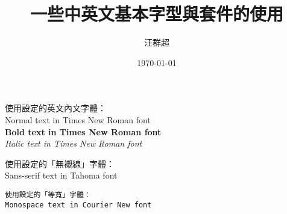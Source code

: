\documentclass[12pt, a4paper]{article}
\title{{\MB 一些中英文基本字型與套件的使用}}	%
\author{{\SM 汪群超}}						%
\date{{\C \today} } 					%
\begin{document}
\maketitle
\fontsize{12}{22pt}\selectfont %

使用設定的英文內文字體：\\
\textnormal{Normal text in Times New Roman font}\\
\textbf{Bold text in Times New Roman font}\\
\textit{Italic text in Times New Roman font}
      
\textsf{使用設定的「無襯線」字體}：\\
\textsf{Sans-serif text in Tahoma font}

\texttt{使用設定的「等寬」字體：}\\
\texttt{Monospace text in Courier New font}
\end{document}
